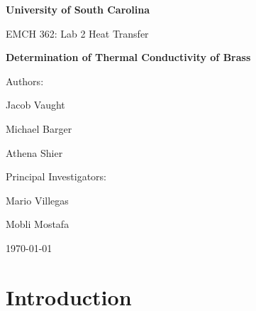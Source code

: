 \documentclass[12pt]{article}
\begin{document}
\begin{titlepage}
    \centering
    \vspace*{1in}
    {\Large\bfseries University of South Carolina \par}
    \vspace{1.5cm}
    {\Large EMCH 362: Lab 2 Heat Transfer \par}
    \vspace{2cm}
    {\huge\bfseries Determination of Thermal Conductivity of Brass \par}
    \vspace{2cm}
    {\Large Authors: \par}
    \vspace{0.5cm}
    {\large Jacob Vaught \par}
    {\large Michael Barger \par}
    {\large Athena Shier \par}
    \vfill
    {\large Principal Investigators: \par}
    \vspace{0.5cm}
    {\large Mario Villegas \par}
    {\large Mobli Mostafa \par}
    \vspace{1cm}
    {\large \today \par}
\end{titlepage}


\begin{abstract}
This experiment aimed to determine the thermal conductivity of a brass sample using a steady-state heat transfer method. A brass specimen was placed between a heat source and a heat sink, with temperatures measured at various points using thermocouples. The thermal conductivity was calculated using Fourier's law of conduction, simplified under steady-state and one-dimensional assumptions. The average thermal conductivity obtained was \num{121.06}\,\si{\watt\per\meter\per\celsius} with a standard deviation of \num{12.41}\,\si{\watt\per\meter\per\celsius}. This value aligns closely with literature values for brass, validating the experimental approach. Sources of error were analyzed, and the results demonstrate the effectiveness of the method in measuring thermal properties of materials.
\end{abstract}

\section{Introduction}
\end{document}
